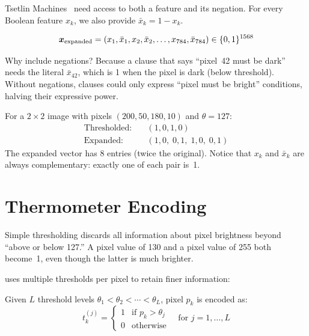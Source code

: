 Tsetlin Machines~\cite{granmo2018tsetlin} need access to both a feature and its negation. For
every Boolean feature $x_k$, we also provide $\bar{x}_k = 1 - x_k$.

\begin{equation}
  \bm{x}_{\text{expanded}} =
    (x_1, \bar{x}_1, x_2, \bar{x}_2, \ldots, x_{784}, \bar{x}_{784})
    \in \{0, 1\}^{1568}
  \label{eq:expanded}
\end{equation}

\begin{keyinsight}
Why include negations? Because a clause that says ``pixel~42 must be
dark'' needs the literal $\bar{x}_{42}$, which is 1 when the pixel is
dark (below threshold). Without negations, clauses could only express
``pixel must be bright'' conditions, halving their expressive power.
\end{keyinsight}

\begin{example}
For a $2 \times 2$ image with pixels $(200, 50, 180, 10)$ and
$\theta = 127$:
\begin{align*}
  \text{Thresholded:}\quad & (1, 0, 1, 0) \\
  \text{Expanded:}\quad & (1, 0, \; 0, 1, \; 1, 0, \; 0, 1)
\end{align*}
The expanded vector has 8 entries (twice the original). Notice that
$x_k$ and $\bar{x}_k$ are always complementary: exactly one of each
pair is~1.
\end{example}


\section{Thermometer Encoding}
\label{sec:thermometer}

Simple thresholding discards all information about pixel brightness
beyond ``above or below 127.'' A pixel value of 130 and a pixel value
of 255 both become~1, even though the latter is much brighter.

 uses multiple thresholds per pixel to
retain finer information:

\begin{definition}
Given $L$ threshold levels
$\theta_1 < \theta_2 < \cdots < \theta_L$, pixel $p_k$ is encoded as:
\begin{equation}
  t_k^{(j)} = \begin{cases}
    1 & \text{if } p_k > \theta_j \\
    0 & \text{otherwise}
  \end{cases}
  \quad \text{for } j = 1, \ldots, L
  \label{eq:thermometer}
\end{equation}
\end{definition}

